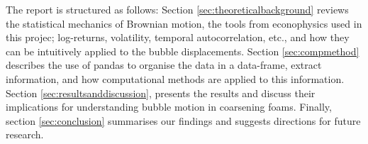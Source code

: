 The report is structured as follows: Section \ref{sec:theoreticalbackground} reviews the statistical mechanics of Brownian motion, the tools from econophysics used in this projec; log-returns, volatility, temporal autocorrelation, etc., and how they can be intuitively applied to the bubble displacements. Section \ref{sec:compmethod} describes the use of pandas to organise the data in a data-frame, extract information, and how computational methods are applied to this information. Section \ref{sec:resultsanddiscussion}, presents the results and discuss their implications for understanding bubble motion in coarsening foams. Finally, section \ref{sec:conclusion} summarises our findings and suggests directions for future research.
